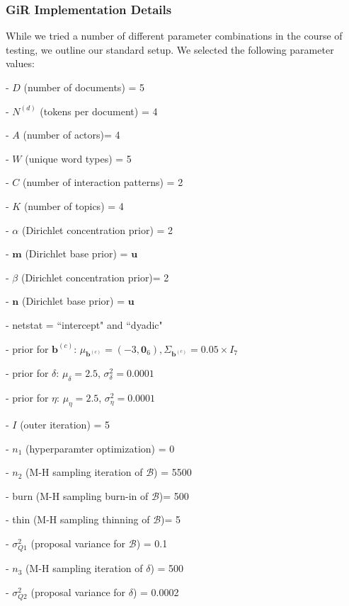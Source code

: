         \subsubsection{GiR Implementation Details} \label{subsubsec: GiR implementation}
        While we tried a number of different parameter combinations in the course of testing, we outline our standard setup. We selected the following parameter values:
        \begin{itemize}
        	\begin{minipage}{0.49\textwidth}
        		\item[-] $D$ (number of documents) = 5
        		\item[-] $N^{(d)}$ (tokens per document) = 4
        		\item[-] $A$ (number of actors)= 4
        		\item[-] $W$ (unique word types) = 5
        		\item[-] $C$ (number of interaction patterns) = 2
        		\item[-] $K$ (number of topics) = 4
        		\item[-] $\alpha$ (Dirichlet concentration prior) = 2
        		\item[-] $\boldsymbol{m}$ (Dirichlet base prior) = $\boldsymbol{u}$ 
        		\item[-] $\beta$ (Dirichlet concentration prior)= 2
        		\item[-] $\boldsymbol{n}$ (Dirichlet base prior) = $\boldsymbol{u}$
        		\item[-] netstat = ``intercept" and ``dyadic"
        	\end{minipage}
        	\begin{minipage}{0.49\textwidth}
        		\item[-] prior for $\boldsymbol{b}^{(c)}$: $\mu_{\boldsymbol{b}^{(c)}} = (-3,\boldsymbol{0}_6), \Sigma_{\boldsymbol{b}^{(c)}} = 0.05\times I_7$
        		\item[-] prior for $\delta$: $\mu_\delta = 2.5$, $\sigma^2_\delta = 0.0001$
        		\item[-] prior for $\eta$: $\mu_\eta = 2.5$, $\sigma^2_\eta = 0.0001$
        		\item[-] $I$ (outer iteration) = 5
        		\item[-] $n_1$ (hyperparamter optimization) = 0
        		\item[-] $n_2$ (M-H sampling iteration of $\mathcal{B}$) = 5500
        		\item[-] burn (M-H sampling burn-in of $\mathcal{B}$)= 500
        		\item[-] thin (M-H sampling thinning of $\mathcal{B}$)= 5
        		\item[-] $\sigma_{Q1}^2$ (proposal variance for $\mathcal{B}$) = 0.1
        		\item[-] $n_3$ (M-H sampling iteration of $\delta$) = 500
        		\item[-] $\sigma_{Q2}^2$ (proposal variance for $\delta$) = 0.0002
        	\end{minipage}
        \end{itemize}        
